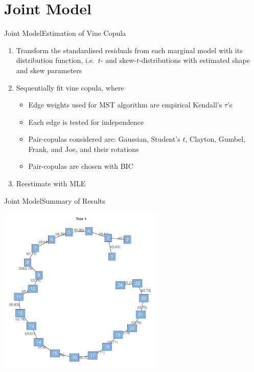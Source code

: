 \section{Joint Model}
\label{sec:joint}

\begin{frame}{Joint Model}{Estimation of Vine Copula}
    \begin{enumerate}
    \item<2-> Transform the standardised residuals from each marginal model with its distribution function, i.e.\ \(t\)- and skew-\(t\)-distributions with estimated shape and skew parameters
    \item<3-> Sequentially fit vine copula, where
      \begin{itemize}
      \item<4-> Edge weights used for MST algorithm are empirical Kendall's \(\tau\)'s
      \item<5-> Each edge is tested for independence
      \item<6-> Pair-copulas considered are: Gaussian, Student's \(t\), Clayton, Gumbel, Frank, and Joe, and their rotations
      \item<7-> Pair-copulas are chosen with BIC
      \end{itemize}
    \item<8-> Reestimate with MLE
    \end{enumerate}
\end{frame}

\begin{frame}{Joint Model}{Summary of Results}
  \begin{center}
    \includegraphics[width=0.6\textwidth]{img/vine}
  \end{center}
\end{frame}

